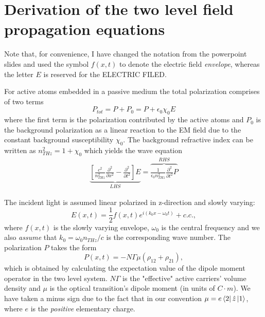 \documentclass[preprint,secnumarabic,amssymb, nobibnotes, aip, prd]{revtex4-1}
\def\p{\partial}
\begin{document}
\section{Derivation of the two level field propagation equations}

Note that, for convenience,  I have changed the notation from the powerpoint slides and used the symbol $f(x,t)$ to denote the electric field \emph{envelope}, whereas the letter $E$ is reserved for the ELECTRIC FILED.


For active atoms embedded in a passive medium the total polarization comprises of two terms
\begin{equation}
P_{tot} = P+P_0 = P+\epsilon_0\chi_0E
\end{equation}
where the first term is the polarization contributed by the active atoms and $P_0$ is the background polarization as a linear reaction to the EM field due to the constant background susceptibility $\chi_0$. The background refractive index can be written as 
$n_{THz}^2 = 1+\chi_0$ which yields the wave equation 
\begin{align}
\label{eq:waveqn}
\underbrace{\left [\frac{c^2}{n_{THz}^2} \frac{\p^2}{\p x^2} -\frac{\p^2}{\p t^2} \right ] E}_{LHS} =\overbrace{\frac{1}{\epsilon_0 n_{THz}^2}\frac{\p^2}{\p t^2}P}^{RHS}  
\end{align}

The incident light is assumed linear polarized in z-direction and slowly varying:
\begin{equation}
E(x,t) =\frac{1}{2}f(x,t)e^{i(k_0x-\omega_0t)}+c.c.,  
\end{equation}
where $f(x,t)$ is the slowly varying envelope, $\omega_0$ is the central frequency and we also \emph{assume} that $k_0=\omega_0 n_{THz}/c$ is the corresponding wave number. 
The polarization $P$ takes the form 
\begin{equation}
P(x,t) =  -N\Gamma\mu (\rho_{12}+\rho_{21}),  
\end{equation}
which is obtained by calculating the expectation value of the dipole moment operator in the two level system. $N\Gamma$ is the 
"effective" active carriers' volume density and $\mu$ is the optical transition's dipole moment (in units of $C\cdot m$). We have taken a minus sign due to the fact that in our convention $\mu = e\bra{2}\hat{z}\ket{1}$, where $e$ is the \emph{positive} elementary charge. 
\end{document}
